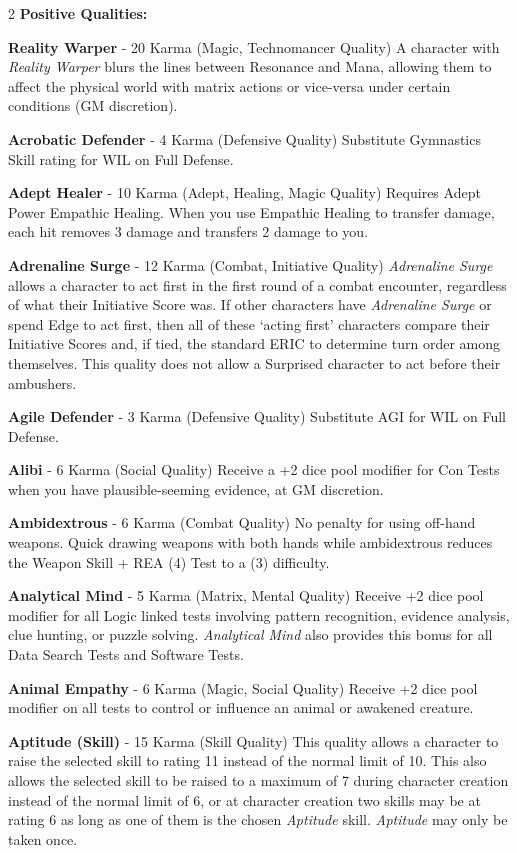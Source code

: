 \documentclass[
  oneside]{article}
\begin{document}
\begin{multicols}{2}
\textbf{Positive Qualities:}

\textbf{Reality Warper} - 20 Karma (Magic,
Technomancer Quality) A character with
\emph{Reality Warper} blurs the lines between
Resonance and Mana, allowing them to affect the
physical world with matrix actions or vice-versa
under certain conditions (GM discretion).

\textbf{Acrobatic Defender} - 4 Karma (Defensive
Quality) Substitute Gymnastics Skill rating for
WIL on Full Defense.

\textbf{Adept Healer} - 10 Karma (Adept, Healing,
Magic Quality) Requires Adept Power Empathic
Healing. When you use Empathic Healing to transfer
damage, each hit removes 3 damage and transfers 2
damage to you.

\textbf{Adrenaline Surge} - 12 Karma (Combat,
Initiative Quality) \emph{Adrenaline Surge} allows
a character to act first in the first round of a
combat encounter, regardless of what their
Initiative Score was. If other characters have
\emph{Adrenaline Surge} or spend Edge to act
first, then all of these `acting first' characters
compare their Initiative Scores and, if tied, the
standard ERIC to determine turn order among
themselves. This quality does not allow a
Surprised character to act before their ambushers.

\textbf{Agile Defender} - 3 Karma (Defensive
Quality) Substitute AGI for WIL on Full Defense.

\textbf{Alibi} - 6 Karma (Social Quality) Receive
a +2 dice pool modifier for Con Tests when you
have plausible-seeming evidence, at GM discretion.

\textbf{Ambidextrous} - 6 Karma (Combat Quality)
No penalty for using off-hand weapons. Quick
drawing weapons with both hands while ambidextrous
reduces the Weapon Skill + REA (4) Test to a (3)
difficulty.

\textbf{Analytical Mind} - 5 Karma (Matrix, Mental
Quality) Receive +2 dice pool modifier for all
Logic linked tests involving pattern recognition,
evidence analysis, clue hunting, or puzzle
solving. \emph{Analytical Mind} also provides this
bonus for all Data Search Tests and Software
Tests.

\textbf{Animal Empathy} - 6 Karma (Magic, Social
Quality) Receive +2 dice pool modifier on all
tests to control or influence an animal or
awakened creature.

\textbf{Aptitude (Skill)} - 15 Karma (Skill
Quality) This quality allows a character to raise
the selected skill to rating 11 instead of the
normal limit of 10. This also allows the selected
skill to be raised to a maximum of 7 during
character creation instead of the normal limit of
6, or at character creation two skills may be at
rating 6 as long as one of them is the chosen
\emph{Aptitude} skill. \emph{Aptitude} may only be
taken once.


\end{multicols}
\end{document}
